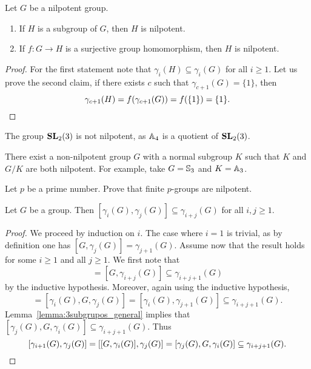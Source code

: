 \begin{theorem}
	\label{theorem:nilpotent}
	Let $G$ be a nilpotent group. 
	\begin{enumerate}
		\item If $H$ is a subgroup of $G$, then $H$ is nilpotent. 
		\item If $f\colon G\to H$ is a surjective group homomorphism, then $H$ is nilpotent. 
	\end{enumerate}
\end{theorem}

\begin{proof}
	For the first statement note that $\gamma_i(H)\subseteq\gamma_i(G)$ for all 
	$i\geq 1$. Let us prove the second claim, if there exists $c$ such that $\gamma_{c+1}(G)=\{1\}$, 
	then 
	\[
	\gamma_{c+1}(H)=f(\gamma_{c+1}(G))=f(\{1\})=\{1\}.\qedhere
	\]
\end{proof}

\begin{example}
    The group $\mathbf{SL}_2(3)$ is not nilpotent, as $\mathbb{A}_4$ 
	is a quotient of $\mathbf{SL}_2(3)$. 
\end{example}

There exist a non-nilpotent group $G$ with a normal subgroup $K$ 
such that $K$ and $G/K$ are both nilpotent. For example, take $G=\mathbb{S}_3$ and $K=\mathbb{A}_3$. 

\begin{exercise}
	Let $p$ be a prime number. Prove that finite $p$-groups are nilpotent. 
\end{exercise}

\begin{theorem}
	\label{theorem:gamma}
	Let $G$ be a group. Then $[\gamma_i(G),\gamma_j(G)]\subseteq
	\gamma_{i+j}(G)$ for all $i,j\geq1$.	
\end{theorem}

\begin{proof}
	We proceed by induction on $i$. The case where $i=1$ is trivial, as by definition one has 
	$[G,\gamma_j(G)]=\gamma_{j+1}(G)$. Assume now that the result holds for 
	some $i\geq1$ and all $j\geq1$. 
	We first note that 	
	\begin{equation*}
		[G,\gamma_i(G),\gamma_j(G)]=[G,\gamma_{i+j}(G)]\subseteq \gamma_{i+j+1}(G)
	\end{equation*}
	by the inductive hypothesis. Moreover, again using the inductive hypothesis,  
	\begin{equation*}
	[\gamma_i(G),\gamma_j(G),G]=[\gamma_{i}(G),G,\gamma_{j}(G)]=[\gamma_i(G),\gamma_{j+1}(G)]\subseteq \gamma_{i+j+1}(G).
	\end{equation*}
	Lemma~\ref{lemma:3subgrupos_general} implies that 
	$[\gamma_j(G),G,\gamma_i(G)]\subseteq \gamma_{i+j+1}(G)$. Thus  
	\[
	[\gamma_{i+1}(G),\gamma_{j}(G)]=[[G,\gamma_{i}(G)],\gamma_j(G)]=[\gamma_j(G),G,\gamma_i(G)]
	\subseteq \gamma_{i+j+1}(G).\qedhere
	\]
\end{proof}

